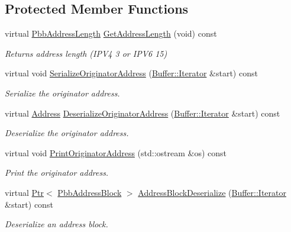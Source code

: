 \subsection*{Protected Member Functions}
\begin{DoxyCompactItemize}
\item 
virtual \hyperlink{namespacens3_a79988e6e8b09f64c6ffca894994cb033}{Pbb\+Address\+Length} \hyperlink{classns3_1_1PbbMessageIpv6_a54ed2d6cd8da2fb35533b5d0755fbb68}{Get\+Address\+Length} (void) const 
\begin{DoxyCompactList}\small\item\em Returns address length (I\+P\+V4 3 or I\+P\+V6 15) \end{DoxyCompactList}\item 
virtual void \hyperlink{classns3_1_1PbbMessageIpv6_a10554714139c1ea3a29736a5d84c1961}{Serialize\+Originator\+Address} (\hyperlink{classns3_1_1Buffer_1_1Iterator}{Buffer\+::\+Iterator} \&start) const 
\begin{DoxyCompactList}\small\item\em Serialize the originator address. \end{DoxyCompactList}\item 
virtual \hyperlink{classns3_1_1Address}{Address} \hyperlink{classns3_1_1PbbMessageIpv6_a17e6a6338fb64d31be30c623cdae60f7}{Deserialize\+Originator\+Address} (\hyperlink{classns3_1_1Buffer_1_1Iterator}{Buffer\+::\+Iterator} \&start) const 
\begin{DoxyCompactList}\small\item\em Deserialize the originator address. \end{DoxyCompactList}\item 
virtual void \hyperlink{classns3_1_1PbbMessageIpv6_ab3a4625d37d8b7c4c9c290c78cc68688}{Print\+Originator\+Address} (std\+::ostream \&os) const 
\begin{DoxyCompactList}\small\item\em Print the originator address. \end{DoxyCompactList}\item 
virtual \hyperlink{classns3_1_1Ptr}{Ptr}$<$ \hyperlink{classns3_1_1PbbAddressBlock}{Pbb\+Address\+Block} $>$ \hyperlink{classns3_1_1PbbMessageIpv6_a74a89b565330f0ae94da518ec5adb6de}{Address\+Block\+Deserialize} (\hyperlink{classns3_1_1Buffer_1_1Iterator}{Buffer\+::\+Iterator} \&start) const 
\begin{DoxyCompactList}\small\item\em Deserialize an address block. \end{DoxyCompactList}\end{DoxyCompactItemize}
